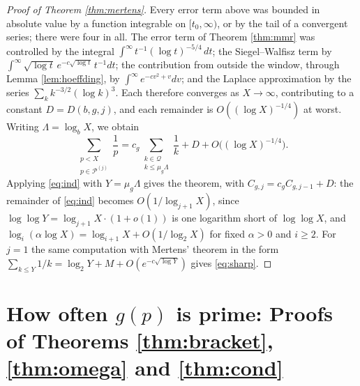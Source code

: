 \documentclass[11pt,reqno]{amsart}
\theoremstyle{plain}
\theoremstyle{definition}
\begin{document}
\begin{proof}[Proof of Theorem \ref{thm:mertens}]
Every error term above was bounded in absolute value by a function integrable on $[t_0,\infty)$, or by the tail of a convergent series; there were four in all. The error term of Theorem \ref{thm:mmr} was controlled by the integral $\int^{\infty}t^{-1}(\log t)^{-5/4}\,dt$; the Siegel--Walfisz term by $\int^{\infty}\sqrt{\log t}\,e^{-c\sqrt{\log t}}\,t^{-1}dt$; the contribution from outside the window, through Lemma \ref{lem:hoeffding}, by $\int^{\infty}e^{-cv^{2}+v}dv$; and the Laplace approximation by the series $\sum_kk^{-3/2}(\log k)^{3}$. Each therefore converges as $X\to\infty$, contributing to a constant $D=D(b,g,j)$, and each remainder is $O((\log X)^{-1/4})$ at worst. Writing $\Lambda=\log_bX$, we obtain
\[
\sum_{\substack{p<X\\ p\in\mathcal P^{(j)}}}\frac1p=c_g\sum_{\substack{k\in\mathcal Q\\ k\le\mu_g\Lambda}}\frac1k+D+O\big((\log X)^{-1/4}\big).
\]
Applying \eqref{eq:ind} with $Y=\mu_g\Lambda$ gives the theorem, with $C_{g,j}=c_gC_{g,j-1}+D$: the remainder of \eqref{eq:ind} becomes $O(1/\log_{j+1}X)$, since $\log\log Y=\log_{j+1}X\cdot(1+o(1))$ is one logarithm short of $\log\log X$, and $\log_{i}(\alpha\log X)=\log_{i+1}X+O(1/\log_2X)$ for fixed $\alpha>0$ and $i\ge2$. For $j=1$ the same computation with Mertens' theorem in the form $\sum_{k\le Y}1/k=\log_2Y+M+O(e^{-c\sqrt{\log Y}})$ gives \eqref{eq:sharp}.
\end{proof}

\section{How often \texorpdfstring{$g(p)$}{g(p)} is prime: Proofs of Theorems \ref{thm:bracket}, \ref{thm:omega} and \ref{thm:cond}}
\end{document}
